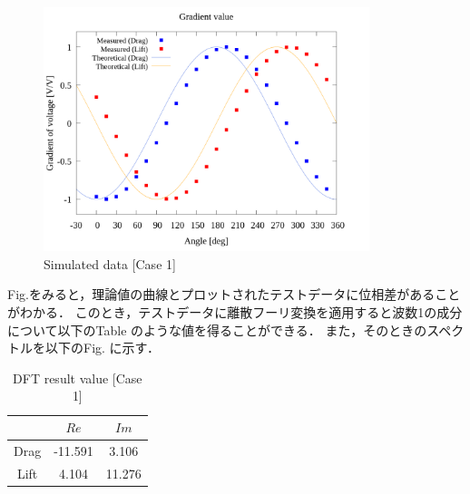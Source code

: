 \begin{figure}[htbp]
    \footnotesize
    \begin{center}
        \includegraphics[width=95mm]{../../02_workspace/result/rotation_tx=15.0_tx=20.0/plot/20/20_adjust-value.png}
        \caption{Simulated data [Case 1]}
    \end{center}
\end{figure}

Fig.をみると，理論値の曲線とプロットされたテストデータに位相差があることがわかる．
このとき，テストデータに離散フーリ変換を適用すると波数1の成分について以下のTable のような値を得ることができる．
また，そのときのスペクトルを以下のFig. に示す．

\begin{table}[htbp]
    \begin{center}
        \caption{DFT result value [Case 1]}
        \begin{tabular}{|p{30mm}|p{20mm}|p{20mm}|}
            \hline
            \multicolumn{1}{|c|}{}       & \multicolumn{1}{|c|}{$Re$}   & \multicolumn{1}{|c|}{$Im$} \\ \hline
            \multicolumn{1}{|c|}{Drag} & \multicolumn{1}{|c|}{-11.591} & \multicolumn{1}{|c|}{3.106}         \\ \hline
            \multicolumn{1}{|c|}{Lift} & \multicolumn{1}{|c|}{4.104}     & \multicolumn{1}{|c|}{11.276}         \\ \hline
        \end{tabular}
    \end{center}
\end{table}

